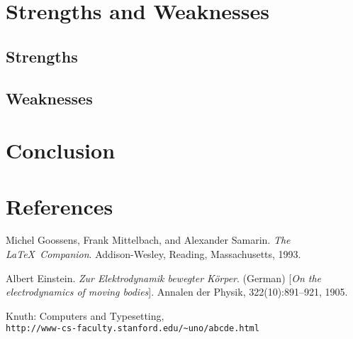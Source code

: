 \documentclass[12pt]{article}
\begin{document}
\section{Strengths and Weaknesses}
\subsection{Strengths}
\subsection{Weaknesses}

\section{Conclusion}

\section{References}

\begin{thebibliography}{9}
Michel Goossens, Frank Mittelbach, and Alexander Samarin. 
\textit{The \LaTeX\ Companion}. 
Addison-Wesley, Reading, Massachusetts, 1993.
 
Albert Einstein. 
\textit{Zur Elektrodynamik bewegter K{\"o}rper}. (German) 
[\textit{On the electrodynamics of moving bodies}]. 
Annalen der Physik, 322(10):891–921, 1905.
 
Knuth: Computers and Typesetting,
\\\texttt{http://www-cs-faculty.stanford.edu/\~{}uno/abcde.html}
\end{thebibliography}
\end{document}
